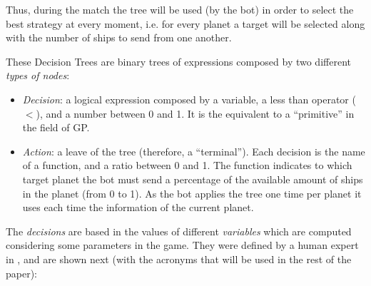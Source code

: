 \documentclass[conference]{IEEEtran}
\begin{document}
Thus, during the match the tree will be used (by the bot) in order to select the best strategy at every moment, i.e. for every planet a target will be selected along with the number of ships to send from one another.

These Decision Trees are binary trees of expressions composed by
two different \textit{types of nodes}:

\begin{itemize}
\item {\em Decision}: a logical expression composed by a variable, a less than operator ($<$), and a number between 0 and 1. It is the equivalent to a ``primitive'' in the field of GP.
\item {\em Action}: a leave of the tree (therefore, a ``terminal''). Each decision is the name of a function, and a ratio between 0 and 1. The function indicates to which target planet the bot must send a percentage of the available amount of ships in the planet (from 0 to 1). As the bot applies the tree one time per planet it uses each time the information of the current planet.

\end{itemize}

The \textit{decisions} are based in the values of different \textit{variables} which are computed considering some parameters in the game. They were defined by a human expert in \cite{GarciaGP14}, and are shown next (with the acronyms that will be used in the rest of the paper):
\end{document}
